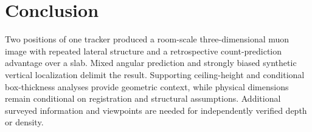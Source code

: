\section{Conclusion}\label{sec:conclusion}
Two positions of one tracker produced a room-scale three-dimensional muon image with repeated lateral structure and a retrospective count-prediction advantage over a slab. Mixed angular prediction and strongly biased synthetic vertical localization delimit the result. Supporting ceiling-height and conditional box-thickness analyses provide geometric context, while physical dimensions remain conditional on registration and structural assumptions. Additional surveyed information and viewpoints are needed for independently verified depth or density.
